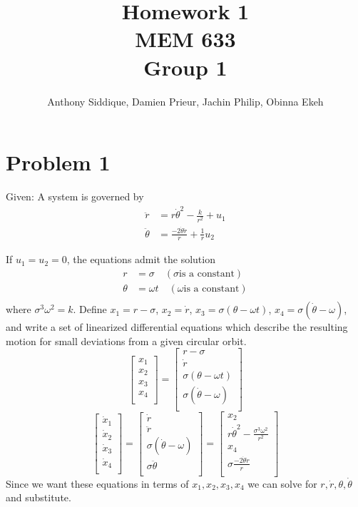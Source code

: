 \documentclass{article}
\author{Anthony Siddique, Damien Prieur, Jachin Philip, Obinna Ekeh}
\title{Homework 1\\ MEM 633 \\ Group 1}
\date{}
\begin{document}
\maketitle

\section*{Problem 1}
Given: A system is governed by
\begin{align*}
\ddot{r} &= r\dot{\theta}^2 - \frac{k}{r^2} + u_1 \\
\ddot{\theta} &= \frac{-2\dot{\theta}\dot{r}}{r}+\frac{1}{r}u_2
\end{align*}

If $u_1 = u_2 = 0$, the equations admit the solution
\begin{align*}
r &= \sigma \quad (\sigma \text{is a constant})\\
\theta &= \omega t \quad (\omega \text{is a constant})\\
\end{align*}
where $\sigma^3\omega^2 = k$.
Define
$x_1 = r - \sigma$,
$x_2 = \dot{r}$,
$x_3 = \sigma(\theta-\omega t)$,
$x_4 = \sigma(\dot{\theta} - \omega)$,
and write a set of linearized differential equations which describe the resulting motion for small deviations from a given circular orbit.
\newline
\newline
$$
\begin{bmatrix}
x_1\\
x_2\\
x_3\\
x_4\\
\end{bmatrix}
=
\begin{bmatrix}
r - \sigma\\
\dot{r}\\
\sigma(\theta-\omega t)\\
\sigma(\dot{\theta} - \omega)\\
\end{bmatrix}
$$
$$
\begin{bmatrix}
\dot{x}_1\\
\dot{x}_2\\
\dot{x}_3\\
\dot{x}_4\\
\end{bmatrix}
=
\begin{bmatrix}
\dot{r}\\
\ddot{r}\\
\sigma(\dot{\theta}-\omega)\\
\sigma\ddot{\theta}\\
\end{bmatrix}
=
\begin{bmatrix}
x_2\\
r\dot{\theta}^2 - \frac{\sigma^3\omega^2}{r^2} \\
x_4\\
\sigma\frac{-2\dot{\theta}\dot{r}}{r}\\
\end{bmatrix}
$$
Since we want these equations in terms of $x_1,x_2,x_3,x_4$ we can solve for $r,\dot{r},\theta,\dot{\theta}$ and substitute.
\end{document}
